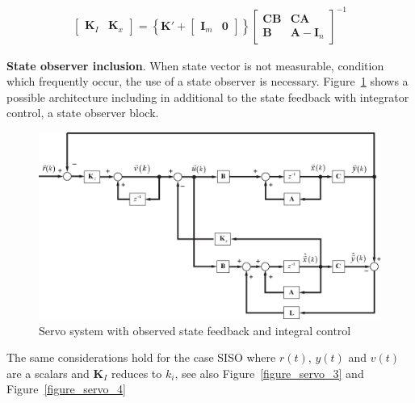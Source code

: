 \documentclass[11pt,a4paper,oneside]{book}
\numberwithin{equation}{section}
\theoremstyle{it}
\theoremstyle{definition}
\begin{document}
\begin{mybox}
\begin{equation}
		\begin{aligned}
			\begin{bmatrix} 
				\mathbf{K}_I & \mathbf{K}_x
			\end{bmatrix} = \left\lbrace \mathbf{K'}+
			\begin{bmatrix} 
				\mathbf{I}_m & \mathbf{0}
			\end{bmatrix}\right\rbrace 
			\begin{bmatrix} 
				\mathbf{C}\mathbf{B} & \mathbf{C}\mathbf{A} \\[6pt] 
				\mathbf{B} & \mathbf{A}-\mathbf{I}_n
			\end{bmatrix}^{-1}
		\end{aligned}
	\end{equation}
\end{mybox}

\vspace{5mm}
\noindent\textbf{State observer inclusion}. When state vector is not 
measurable, condition which frequently occur, the use of a state observer is 
necessary. Figure~\ref{figure_servo_2} shows a possible architecture including 
in additional to the state feedback with integrator control, a state observer 
block.
\begin{figure}[H]
	\centering
	\includegraphics[width = 475pt, 
	keepaspectratio,angle=0]{figures/servo_2.eps}
	\captionsetup{width=0.5\textwidth, font=small}
	\caption{Servo system with observed state feedback and integral control}
	\label{figure_servo_2}
\end{figure}

The same considerations hold for the case SISO where $r(t)$, $y(t)$ and $v(t)$ are a scalars and $\mathbf{K}_I$ reduces to $k_i$, see also Figure~\ref{figure_servo_3} and Figure~\ref{figure_servo_4}
\end{document}
